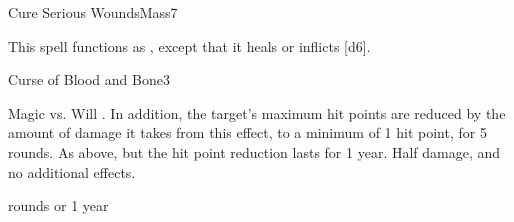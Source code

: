 \begin{spellsection}{Cure Serious Wounds}{Mass}{7}
\begin{spellheader}
\end{spellheader}
\begin{spellcontent}
    \begin{spelltargetinginfo}
    \end{spelltargetinginfo}
    \begin{spelleffects}
        \spellspecial This spell functions as , except that it heals or inflicts [d6].
    \end{spelleffects}
\end{spellcontent}
\begin{spellfooter}
\end{spellfooter}
\end{spellsection}

\begin{spellsection}{Curse of Blood and Bone}{3}
\begin{spellheader}
\end{spellheader}
\begin{spellcontent}
    \begin{spelltargetinginfo}
    \end{spelltargetinginfo}
    \begin{spelleffects}
        \begin{spellattack}{Magic vs. Will}
            \spellsuccess {}. In addition, the target's maximum hit points are reduced by the amount of damage it takes from this effect, to a minimum of 1 hit point, for 5 rounds.
            \spellcritical As above, but the hit point reduction lasts for 1 year.
            \spellfailure Half damage, and no additional effects.
        \end{spellattack}
         rounds or 1 year
    \end{spelleffects}
\end{spellcontent}
\begin{spellfooter}
    \spellnotes \cursespellnotes
\end{spellfooter}
\end{spellsection}

